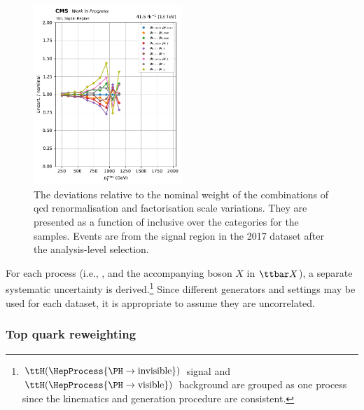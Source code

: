 \begin{figure}[htbp]
    \centering
    \includegraphics[width=0.5\textwidth]{figures/qcd_scale_top_procs/ttbar/ratio_vars_SR_ttH.pdf}
    \caption[The deviations relative to the nominal weight of the combinations of QCD renormalisation and factorisation scale variations. They are presented as a function of \ptmiss inclusive over the \ttH categories for the \ttbar samples]{The deviations relative to the nominal weight of the combinations of \acrshort{qcd} renormalisation and factorisation scale variations. They are presented as a function of \ptmiss inclusive over the \ttH categories for the \ttbar samples. Events are from the signal region in the 2017 dataset after the analysis-level selection.}
    \label{fig:htoinv_ttbar_scale}
\end{figure}


For each process (i.e., \ttbar, and the accompanying boson $X$ in $\ttbar X$), a separate systematic uncertainty is derived.\footnote{$\ttH(\HepProcess{\PH \to \text{invisible}})$ signal and $\ttH(\HepProcess{\PH \to \text{visible}})$ background are grouped as one process since the kinematics and generation procedure are consistent.} Since different generators and settings may be used for each dataset, it is appropriate to assume they are uncorrelated.




\subsubsection{Top quark \texorpdfstring{\pt}{pT} reweighting}
\label{subsubsec:htoinv_top_pt_reweighting}

